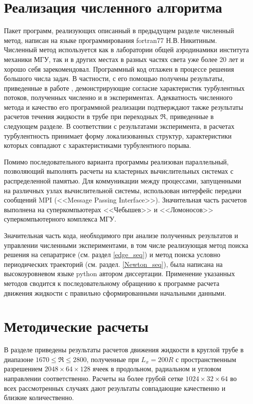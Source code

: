 \section{Реализация численного алгоритма}

Пакет программ, реализующих описанный в предыдущем разделе численный метод, написан на языке программирования fortran77 Н.В.\,Никитиным. Численный метод используется как в лаборатории общей аэродинамики института механики МГУ, так и в других местах в разных частях света уже более 20 лет и хорошо себя зарекомендовал. Программный код отлажен в процессе решения большого числа задач. В частности, с его помощью получены результаты, приведенные в работе \cite{Nikitin2006}, демонстрирующие согласие характеристик турбулентных потоков, полученных численно и в экспериментах. Адекватность численного метода и качество его программной реализации подтверждают также результаты расчетов течения жидкости в трубе при переходных $\Re$, приведенные в следующем разделе. В соответствии с результатами эксперимента, в расчетах турбулентность принимает форму локализованных структур, характеристики которых совпадают с характеристиками турбулентного порыва.

Помимо последовательного варианта программы реализован параллельный, позволяющий выполнять расчеты на кластерных вычислительных системах с распределенной памятью. Для коммуникации между процессами, запущенными на различных узлах вычислительной системы, использован интерфейс передачи сообщений MPI (<<Message Passing Interface>>). Значительная часть расчетов выполнена на суперкомпьютерах <<Чебышев>> и <<Ломоносов>> суперкомпьютерного комплекса МГУ. 

Значительная часть кода, необходимого при анализе полученных результатов и управлении численными экспериментами, в том числе реализующая метод поиска решения на сепаратрисе (см. раздел \ref{edge_seq}) и метод поиска условно периодических траекторий (см. раздел. \ref{Newton_seq}), была написана на высокоуровневом языке python автором диссертации. Применение указанных методов сводится к последовательному обращению к программе расчета движения жидкости с правильно сформированными начальными данными. 


\section{Методические расчеты} \label{puff_calc}

В разделе приведены результаты расчетов движения жидкости в круглой трубе в диапазоне $1670 \leqslant \Re \leqslant 2800$, полученные при $L_x=200R$ с пространственным разрешением $2048 \times 64 \times 128$ ячеек в продольном, радиальном и угловом направлении соответственно. Расчеты на более грубой сетке $1024 \times 32 \times 64$ во всех рассмотренных случаях дают результаты совпадающие качественно и близкие количественно.

